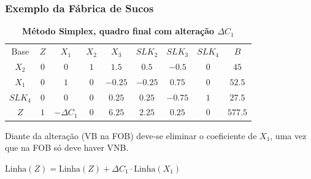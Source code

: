 \documentclass{beamer}
\begin{document}
\begin{frame}
	\frametitle{Exemplo da Fábrica de Sucos}
	\begin{table}
		\scriptsize
		\caption{{\textbf{Método Simplex, quadro final com alteração $\Delta C_1$}}}
		\begin{tabular}{c c c c c c c c c}
			\cellcolor{blue} {\color{white} Base} &
			\cellcolor{blue} {\color{white} $Z$} &
			\cellcolor{blue} {\color{white} $X_1$} &
			\cellcolor{blue} {\color{red} $X_2$} &
			\cellcolor{blue} {\color{red} $X_3$} &
			\cellcolor{blue} {\color{white} $SLK_2$} &
			\cellcolor{blue} {\color{white} $SLK_3$} &
			\cellcolor{blue} {\color{red} $SLK_4$} &
			\cellcolor{blue} {\color{white} $B$} \\
			\cellcolor{blue} {\color{red} $X_2$} &
			\cellcolor{yellow} $0$& 
			\cellcolor{yellow} $0$& 
			\cellcolor{yellow} $1$& 
			\cellcolor{yellow} $1.5$& 
			\cellcolor{yellow} $0.5$& 
			\cellcolor{yellow} $-0.5$& 
			\cellcolor{yellow} $0$&
			\cellcolor{yellow} $45$\\
			\cellcolor{blue} {\color{red} $X_1$} &
			\cellcolor{yellow} $0$& 
			\cellcolor{yellow} $1$& 
			\cellcolor{yellow} $0$& 
			\cellcolor{yellow} $-0.25$& 
			\cellcolor{yellow} $-0.25$& 
			\cellcolor{yellow} $0.75$& 
			\cellcolor{yellow} $0$&
			\cellcolor{yellow} $52.5$\\
			\cellcolor{blue} {\color{red} $SLK_4$} &
			\cellcolor{yellow} $0$& 
			\cellcolor{yellow} $0$& 
			\cellcolor{yellow} $0$& 
			\cellcolor{yellow} $0.25$& 
			\cellcolor{yellow} $0.25$& 
			\cellcolor{yellow} $-0.75$& 
			\cellcolor{yellow} $1$&
			\cellcolor{yellow} $27.5$\\
			\cellcolor{blue} {\color{white} $Z$} &
			\cellcolor{yellow} $1$& 
			\cellcolor{green} $-\Delta C_1$& 
			\cellcolor{yellow} $0$& 
			\cellcolor{yellow} $6.25$& 
			\cellcolor{yellow} $2.25$& 
			\cellcolor{yellow} $0.25$& 
			\cellcolor{yellow} $0$&
			\cellcolor{yellow} $577.5$\\
		\end{tabular}
	\end{table}
	Diante da alteração (VB na FOB) deve-se eliminar o coeficiente de $X_1$, uma vez que na FOB só deve haver VNB.
	\begin{mdframed}[backgroundcolor=gray!50]
		\centering
		$\text{Linha}(Z) = \text{Linha}(Z) + \Delta C_1 \cdot \text{Linha}(X_1) $
	\end{mdframed}
	

\end{frame}
\end{document}
